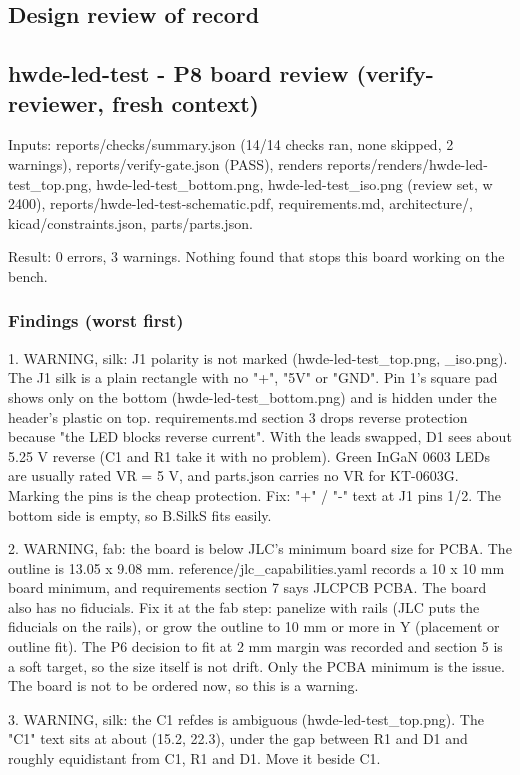 \documentclass[11pt]{article}
\begin{document}
\subsection*{Design review of record}
\subsection*{hwde-led-test - P8 board review (verify-reviewer, fresh context)}
Inputs: reports/checks/summary.json (14/14 checks ran, none skipped, 2 warnings), reports/verify-gate.json (PASS), renders reports/renders/hwde-led-test\_top.png, hwde-led-test\_bottom.png, hwde-led-test\_iso.png (review set, w 2400), reports/hwde-led-test-schematic.pdf, requirements.md, architecture/, kicad/constraints.json, parts/parts.json.

Result: 0 errors, 3 warnings. Nothing found that stops this board working on the bench.

\subsubsection*{Findings (worst first)}
1. WARNING, silk: J1 polarity is not marked (hwde-led-test\_top.png, \_iso.png). The J1 silk is a plain rectangle with no "+", "5V" or "GND". Pin 1's square pad shows only on the bottom (hwde-led-test\_bottom.png) and is hidden under the header's plastic on top. requirements.md section 3 drops reverse protection because "the LED blocks reverse current". With the leads swapped, D1 sees about 5.25 V reverse (C1 and R1 take it with no problem). Green InGaN 0603 LEDs are usually rated VR = 5 V, and parts.json carries no VR for KT-0603G. Marking the pins is the cheap protection. Fix: "+" / "-" text at J1 pins 1/2. The bottom side is empty, so B.SilkS fits easily.

2. WARNING, fab: the board is below JLC's minimum board size for PCBA. The outline is 13.05 x 9.08 mm. reference/jlc\_capabilities.yaml records a 10 x 10 mm board minimum, and requirements section 7 says JLCPCB PCBA. The board also has no fiducials. Fix it at the fab step: panelize with rails (JLC puts the fiducials on the rails), or grow the outline to 10 mm or more in Y (placement or outline fit). The P6 decision to fit at 2 mm margin was recorded and section 5 is a soft target, so the size itself is not drift. Only the PCBA minimum is the issue. The board is not to be ordered now, so this is a warning.

3. WARNING, silk: the C1 refdes is ambiguous (hwde-led-test\_top.png). The "C1" text sits at about (15.2, 22.3), under the gap between R1 and D1 and roughly equidistant from C1, R1 and D1. Move it beside C1.
\end{document}
